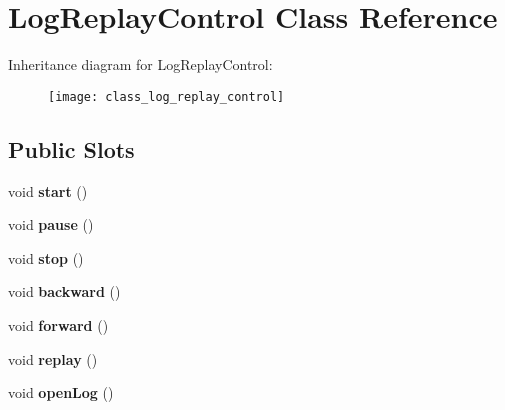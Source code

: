 \hypertarget{class_log_replay_control}{\section{Log\-Replay\-Control Class Reference}
\label{class_log_replay_control}
}
Inheritance diagram for Log\-Replay\-Control\-:\begin{figure}[H]
\begin{center}
\leavevmode
\texttt{[image: class\_log\_replay\_control]}
\end{center}
\end{figure}
\subsection*{Public Slots}
\begin{DoxyCompactItemize}
\item 
\hypertarget{class_log_replay_control_a87347e3c52b61940d60c4a255e6c2173}{void {\bfseries start} ()}\label{class_log_replay_control_a87347e3c52b61940d60c4a255e6c2173}

\item 
\hypertarget{class_log_replay_control_abf14471473ecc4adf6077517ff32ad68}{void {\bfseries pause} ()}\label{class_log_replay_control_abf14471473ecc4adf6077517ff32ad68}

\item 
\hypertarget{class_log_replay_control_acf3e5271561368519a090e6a79c8bbb4}{void {\bfseries stop} ()}\label{class_log_replay_control_acf3e5271561368519a090e6a79c8bbb4}

\item 
\hypertarget{class_log_replay_control_a3e2887cd54614692a191bb951ca3ae06}{void {\bfseries backward} ()}\label{class_log_replay_control_a3e2887cd54614692a191bb951ca3ae06}

\item 
\hypertarget{class_log_replay_control_a8cad7de34d084c13b8009b8e22c9455c}{void {\bfseries forward} ()}\label{class_log_replay_control_a8cad7de34d084c13b8009b8e22c9455c}

\item 
\hypertarget{class_log_replay_control_a126f327ce4d43e70a6b0183b34201924}{void {\bfseries replay} ()}\label{class_log_replay_control_a126f327ce4d43e70a6b0183b34201924}

\item 
\hypertarget{class_log_replay_control_a5edfc122c0276a3c37814551c9df7fff}{void {\bfseries open\-Log} ()}\label{class_log_replay_control_a5edfc122c0276a3c37814551c9df7fff}

\end{DoxyCompactItemize}
